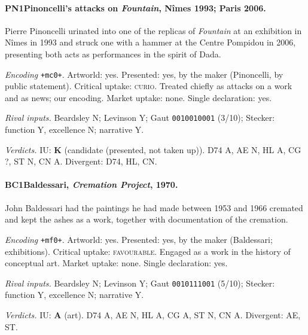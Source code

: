 \paragraph{PN1\enspace Pinoncelli's attacks on \emph{Fountain}, N\^imes 1993; Paris 2006.}
Pierre Pinoncelli urinated into one of the replicas of \emph{Fountain} at an exhibition in N\^imes in 1993 and struck one with a hammer at the Centre Pompidou in 2006, presenting both acts as performances in the spirit of Dada.\par
\noindent\textit{Encoding} \texttt{+mc0+}. Artworld: yes. Presented: yes, by the maker (Pinoncelli, by public statement). Critical uptake: \textsc{curio}. Treated chiefly as attacks on a work and as news; our encoding. Market uptake: none. Single declaration: yes.\par
\noindent\textit{Rival inputs.} Beardsley N; Levinson Y; Gaut \texttt{0010010001} (3/10); Stecker: function Y, excellence N; narrative Y.\par
\noindent\textit{Verdicts.} IU: \textbf{K} (candidate (presented, not taken up)). D74 A, AE N, HL A, CG ?, ST N, CN A. Divergent: D74, HL, CN.\par

\paragraph{BC1\enspace Baldessari, \emph{Cremation Project}, 1970.}
John Baldessari had the paintings he had made between 1953 and 1966 cremated and kept the ashes as a work, together with documentation of the cremation.\par
\noindent\textit{Encoding} \texttt{+mf0+}. Artworld: yes. Presented: yes, by the maker (Baldessari; exhibitions). Critical uptake: \textsc{favourable}. Engaged as a work in the history of conceptual art. Market uptake: none. Single declaration: yes.\par
\noindent\textit{Rival inputs.} Beardsley N; Levinson Y; Gaut \texttt{0010111001} (5/10); Stecker: function Y, excellence N; narrative Y.\par
\noindent\textit{Verdicts.} IU: \textbf{A} (art). D74 A, AE N, HL A, CG A, ST N, CN A. Divergent: AE, ST.\par


